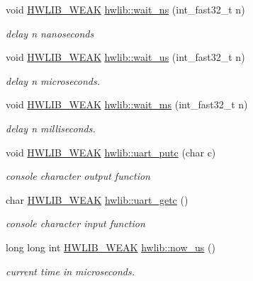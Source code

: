 \begin{DoxyCompactItemize}
\item 
void \hyperlink{hwlib-defines_8hpp_a04be4340016df60d6636c1d1c6d94fc9}{H\+W\+L\+I\+B\+\_\+\+W\+E\+AK} \hyperlink{namespacehwlib_a9c01a1d0319f5eadd8926e66aea19aa0}{hwlib\+::wait\+\_\+ns} (int\+\_\+fast32\+\_\+t n)
\begin{DoxyCompactList}\small\item\em delay n nanoseconds \end{DoxyCompactList}\item 
void \hyperlink{hwlib-defines_8hpp_a04be4340016df60d6636c1d1c6d94fc9}{H\+W\+L\+I\+B\+\_\+\+W\+E\+AK} \hyperlink{namespacehwlib_a0096b739fc566c896366ecbd3113cc1e}{hwlib\+::wait\+\_\+us} (int\+\_\+fast32\+\_\+t n)
\begin{DoxyCompactList}\small\item\em delay n microseconds. \end{DoxyCompactList}\item 
void \hyperlink{hwlib-defines_8hpp_a04be4340016df60d6636c1d1c6d94fc9}{H\+W\+L\+I\+B\+\_\+\+W\+E\+AK} \hyperlink{namespacehwlib_a6119aa5d3034176aa1515ef4bb193044}{hwlib\+::wait\+\_\+ms} (int\+\_\+fast32\+\_\+t n)
\begin{DoxyCompactList}\small\item\em delay n milliseconds. \end{DoxyCompactList}\item 
void \hyperlink{hwlib-defines_8hpp_a04be4340016df60d6636c1d1c6d94fc9}{H\+W\+L\+I\+B\+\_\+\+W\+E\+AK} \hyperlink{namespacehwlib_ae568ebef4b8d8a77cecae8cea595896f}{hwlib\+::uart\+\_\+putc} (char c)
\begin{DoxyCompactList}\small\item\em console character output function \end{DoxyCompactList}\item 
char \hyperlink{hwlib-defines_8hpp_a04be4340016df60d6636c1d1c6d94fc9}{H\+W\+L\+I\+B\+\_\+\+W\+E\+AK} \hyperlink{namespacehwlib_a0f433c14b5302d476ed723a38862d9d3}{hwlib\+::uart\+\_\+getc} ()
\begin{DoxyCompactList}\small\item\em console character input function \end{DoxyCompactList}\item 
long long int \hyperlink{hwlib-defines_8hpp_a04be4340016df60d6636c1d1c6d94fc9}{H\+W\+L\+I\+B\+\_\+\+W\+E\+AK} \hyperlink{namespacehwlib_aa96fdf113860b88c1d99f4152c7bf28f}{hwlib\+::now\+\_\+us} ()
\begin{DoxyCompactList}\small\item\em current time in microseconds. \end{DoxyCompactList}\end{DoxyCompactItemize}

